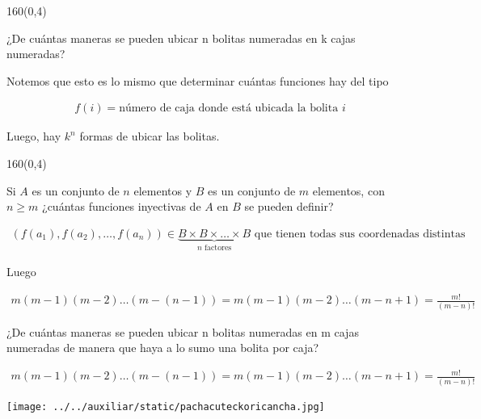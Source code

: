\documentclass[shownotes,aspectratio=169]{beamer}
\newif\ifes
\newcommand{\es}[1]{\ifes#1\fi}
\begin{document}
\begin{frame}[plain]
 \begin{textblock}{160}(0,4)
 \centering \LARGE 
 \es{Bolitas numeradas en cajas numeradas}
 \end{textblock}
 \vspace{1cm}
 \centering
 
 ¿De cuántas maneras se pueden ubicar n bolitas numeradas en k cajas numeradas?
 
 \vspace{0.3cm}
 
 Notemos que esto es lo mismo que determinar cuántas funciones hay del tipo 
 
 \begin{align*}
  f(i) = \text{número de caja donde está ubicada la bolita } i
 \end{align*}
 
 Luego, hay $k^n$ formas de ubicar las bolitas.

 \end{frame}

 \begin{frame}[plain]
 \begin{textblock}{160}(0,4)
 \centering \LARGE 
 \es{Funciones inyectivas}
 \end{textblock}
 \vspace{1cm}
 \centering
 
 Si $A$ es un conjunto de $n$ elementos y $B$ es un conjunto de $m$ elementos, con $n \geq m$
¿cuántas funciones inyectivas de $A$ en $B$ se pueden definir?
 
\begin{align*}
 (f(a_1),f(a_2),\dots,f(a_n)) \in \underbrace{B \times B \times \dots \times B}_{n \text{ factores}} \text{ que tienen todas sus coordenadas distintas}
\end{align*}

Luego

\begin{align*}
 m(m-1)(m-2)\dots(m-(n-1)) = m(m-1)(m-2)\dots(m-n+1) = \frac{m!}{(m-n)!}
\end{align*}

 
 \end{frame}

 
 \begin{frame}[plain]
  
  ¿De cuántas maneras se pueden ubicar n bolitas numeradas en m cajas
numeradas de manera que haya a lo sumo una bolita por caja?


\begin{align*}
 m(m-1)(m-2)\dots(m-(n-1)) = m(m-1)(m-2)\dots(m-n+1) = \frac{m!}{(m-n)!}
\end{align*}

 \end{frame}


\begin{frame}[plain]
\centering
  \texttt{[image: ../../auxiliar/static/pachacuteckoricancha.jpg]}
\end{frame}
\end{document}
